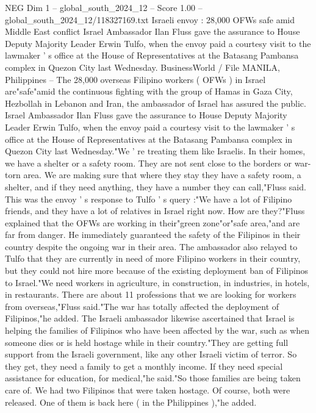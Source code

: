 \begin{textsample}{NEG Dim 1 – global\_south\_2024\_12 – Score 1.00 – global\_south\_2024\_12/118327169.txt}  \label{ex:f1_neg_257}
Israeli envoy : 28,000 OFWs safe amid Middle East conflict Israel Ambassador Ilan Fluss gave the assurance to House Deputy Majority Leader Erwin Tulfo, when the envoy paid a courtesy visit to the lawmaker ' s office at the House of Representatives at the Batasang Pambansa complex in Quezon City last Wednesday.
BusinessWorld / File MANILA, Philippines -- The 28,000 overseas Filipino workers ( OFWs ) in Israel are"safe"amid the continuous fighting with the group of Hamas in Gaza City, Hezbollah in Lebanon and Iran, the ambassador of Israel has assured the public.
Israel Ambassador Ilan Fluss gave the assurance to House Deputy Majority Leader Erwin Tulfo, when the envoy paid a courtesy visit to the lawmaker ' s office at the House of Representatives at the Batasang Pambansa complex in Quezon City last Wednesday."We ' re treating them like Israelis.
In their homes, we have a shelter or a safety room.
They are not sent close to the borders or war-torn area.
We are making sure that where they stay they have a safety room, a shelter, and if they need anything, they have a number they can call,"Fluss said.
This was the envoy ' s response to Tulfo ' s query :"We have a lot of Filipino friends, and they have a lot of relatives in Israel right now.
How are they?"Fluss explained that the OFWs are working in their"green zone"or"safe area,"and are far from danger.
He immediately guaranteed the safety of the Filipinos in their country despite the ongoing war in their area.
The ambassador also relayed to Tulfo that they are currently in need of more Filipino workers in their country, but they could not hire more because of the existing deployment ban of Filipinos to Israel."We need workers in agriculture, in construction, in industries, in hotels, in restaurants.
There are about 11 professions that we are looking for workers from overseas,"Fluss said."The war has totally affected the deployment of Filipinos,"he added.
The Israeli ambassador likewise ascertained that Israel is helping the families of Filipinos who have been affected by the war, such as when someone dies or is held hostage while in their country."They are getting full support from the Israeli government, like any other Israeli victim of terror.
So they get, they need a family to get a monthly income.
If they need special assistance for education, for medical,"he said."So those families are being taken care of.
We had two Filipinos that were taken hostage.
Of course, both were released.
One of them is back here ( in the Philippines ),"he added.

\end{textsample}
